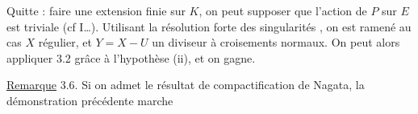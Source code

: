 Quitte : faire une extension finie  sur $K$, on peut supposer que l'action de $P$ sur $E$ est triviale (cf I\ldots). Utilisant la résolution  forte des singularités , on est ramené au cas $X$ régulier, et $Y=X-U$ un diviseur à croisements normaux. On peut alors appliquer 3.2 grâce à l'hypothèse (ii), et on gagne.

\uline{Remarque} 3.6. Si on admet le résultat de compactification de Nagata, la démonstration précédente marche
